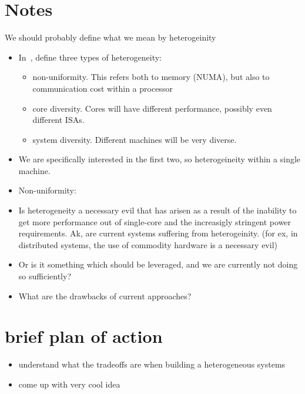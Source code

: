 \clearpage
\section{Notes}

We should probably define what
we mean by heterogeinity

\begin{itemize}
\item In~\cite{SPBRBHI:08}, define three types of heterogeneity:
\begin{itemize}
\item non-uniformity.  This refers both to memory (NUMA), but also
to communication cost within a processor
\item core diversity. Cores will have different performance, possibly
even different ISAs.
\item system diversity. Different machines will be very diverse.
\end{itemize}
\item We are specifically interested in the first two, so heterogeineity
within a single machine.
\item Non-uniformity:
\item Is heterogeneity a necessary evil that has arisen as
a result of the inability to get more performance out of single-core
and the increasigly stringent power requirements. Ak,
are current systems suffering from heterogeinity. (for ex,
in distributed systems, the use of commodity hardware is a necessary evil)
\item Or is it something which should be leveraged, and we are currently
not doing so sufficiently?
\item What are the drawbacks of current approaches?
\end{itemize}
\section{brief plan of action}
\begin{itemize}
 \item understand what the tradeoffs are
when building a heterogeneous systems
 \item come up with very cool idea
\end{itemize}
